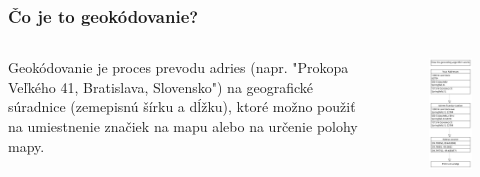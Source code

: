 \documentclass{beamer}
\begin{document}
\begin{frame}[fragile=singleslide]\frametitle{Čo je to geokódovanie?}
\begin{columns}
	\begin{column}{0.5\textwidth}
	Geokódovanie je proces prevodu adries (napr. "Prokopa Veľkého 41, Bratislava, Slovensko") na geografické súradnice (zemepisnú šírku a dĺžku), ktoré možno použiť na umiestnenie značiek na mapu alebo na určenie polohy mapy.
	\end{column}
		
	\begin{column}{0.5\textwidth}
	\begin{figure}[h]
		\centering
		\includegraphics[scale=0.27]{diagram1.pdf}

\end{figure}
\end{column}
\end{columns}
\end{frame}
\end{document}
